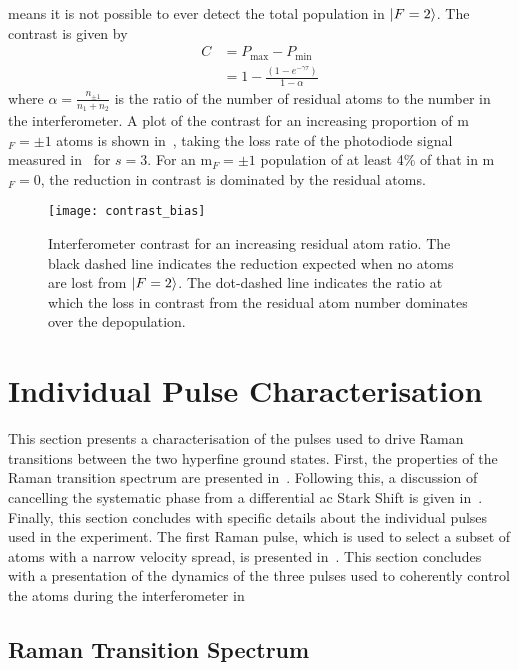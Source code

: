 means it is not possible to ever detect the total
population in \(\ket{F=2}\). The contrast is given by
\begin{align}
  C &=  P_\text{max} - P_\text{min} \nonumber \\
  & = 1 - \frac{(1-e^{-\gamma \tau})}{1-\alpha}
  \label{eq:contrast}
\end{align}
where \(\alpha = \frac{n_{\pm{1}}}{n_1+n_2}\) is the ratio of the
number of residual
atoms to the number in the interferometer.
A plot of the contrast for an increasing
proportion of m\(_F = \pm 1\) atoms is shown
in~, taking the loss rate of the
photodiode signal
measured in~ for \(s = 3\). For an
m\(_F=\pm 1\) population of at least
4\% of that in m\(_F = 0\), the reduction in contrast is dominated by
the residual atoms.  
\begin{figure}[htpb]
  \centering
  \texttt{[image: contrast\_bias]}
  \caption[Interferometer contrast for an increasing
  resudual atoms ratio]{Interferometer contrast for an increasing
    residual atom ratio.
    The black dashed line indicates the reduction expected when no
    atoms are lost from \(\ket{F=2}\). The dot-dashed line indicates
  the ratio at which the loss in contrast from the residual atom
number dominates over the depopulation.}
  \label{fig:contrast_bias}
\end{figure}


\section{Individual Pulse Characterisation} \label{sec:atomint_rabiosc}
This section presents a characterisation of the pulses used to drive
Raman transitions between the two hyperfine ground states. First, the
properties of the Raman transition spectrum are presented
in~. Following this, a discussion of
cancelling the systematic phase from a differential ac Stark Shift is
given in~. Finally, this section
concludes with specific details about the individual pulses used in
the experiment. The first Raman pulse, which is used to select a
subset of atoms with a narrow velocity spread, is presented
in~. This section concludes with a presentation
of the dynamics of the three pulses used to coherently control the
atoms during the interferometer in~
\subsection{Raman Transition Spectrum}\label{subsec:raman_spec}

